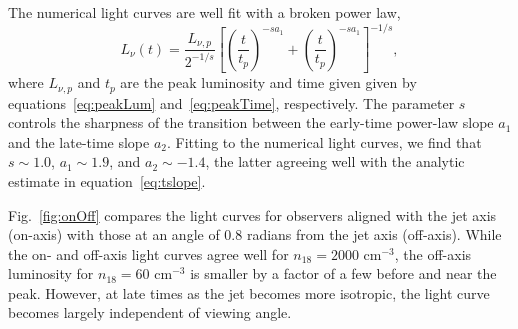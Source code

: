 \documentclass[usenatbib,fleqn]{mnras}
\begin{document}
The numerical light curves are well fit with a broken power law,
\begin{equation}
L_\nu (t) =\frac{L_{\nu, p}}{2^{-1/s}}
\left[\left(\frac{t}{t_p}\right)^{-s
    a_1}+\left(\frac{t}{t_p}\right)^{-s a_1}\right]^{-1/s}, 
\label{eq:lcAnal}
\end{equation}
where $L_{\nu, p}$ and $t_p$ are the peak luminosity and time given
given by equations~\eqref{eq:peakLum} and~\eqref{eq:peakTime},
respectively.  The parameter $s$ controls the sharpness of the
transition between the early-time power-law slope $a_1$ and the
late-time slope $a_2$.  Fitting to the numerical light curves, we find
that $s\sim 1.0$, $a_1\sim 1.9$, and $a_2\sim -1.4$, the latter
agreeing well with the analytic estimate in
equation~\eqref{eq:tslope}.


Fig.~\ref{fig:onOff} compares the light curves for observers aligned
with the jet axis (on-axis) with those at an angle of 0.8 radians from
the jet axis (off-axis).  While the on- and off-axis light curves
agree well for $n_{18}=2000$ cm$^{-3}$, the off-axis luminosity for
$n_{18}=60$ cm$^{-3}$ is smaller by a factor of a few before and near
the peak.  However, at late times as the jet becomes more isotropic,
the light curve becomes largely independent of viewing angle.
\end{document}
